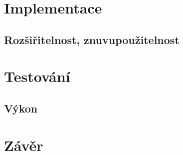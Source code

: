 \chapter{Implementace}
\section{Rozšiřitelnost, znuvupoužitelnost}

\chapter{Testování}
\section{Výkon}

\chapter{Závěr}


